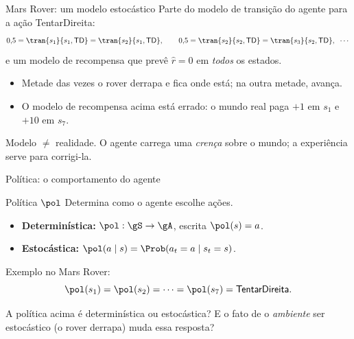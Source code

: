 \documentclass[aspectratio=169, 11pt]{beamer}
\newcommand{\paradiscussao}{\smallskip
  {\footnotesize\color{rlCinza}\itshape }}
\begin{document}
\begin{frame}{Mars Rover: um modelo estocástico}
  Parte do modelo de transição do agente para a ação
  \textsf{TentarDireita}:
  \[
    0{,}5 = \tran{s_1}{s_1, \textsf{TD}} = \tran{s_2}{s_1, \textsf{TD}},
    \qquad
    0{,}5 = \tran{s_2}{s_2, \textsf{TD}} = \tran{s_3}{s_2, \textsf{TD}},
    \;\;\cdots
  \]
  e um modelo de recompensa que prevê $\hat r = 0$ em \emph{todos} os
  estados.

  \begin{itemize}
    \item Metade das vezes o rover derrapa e fica onde está; na outra
          metade, avança.
    \item O modelo de recompensa acima está \alert{errado}: o mundo real
          paga $+1$ em $s_1$ e $+10$ em $s_7$.
  \end{itemize}

  \begin{ideiabox}
    Modelo $\neq$ realidade. O agente carrega uma \emph{crença} sobre o
    mundo; a experiência serve para corrigi-la.
  \end{ideiabox}
\end{frame}

\begin{frame}{Política: o comportamento do agente}
  \begin{defbox}{Política $\pol$}
    Determina como o agente escolhe ações.
    \begin{itemize}
      \item \textbf{Determinística:} $\pol : \gS \to \gA$, escrita
            $\pol(s) = a$.
      \item \textbf{Estocástica:} $\pol(a \mid s) =
            \Prob(a_t = a \mid s_t = s)$.
    \end{itemize}
  \end{defbox}

  \medskip
  Exemplo no Mars Rover:
  \[
    \pol(s_1) = \pol(s_2) = \cdots = \pol(s_7) = \textsf{TentarDireita}.
  \]

  \begin{quizbox}{}
    A política acima é determinística ou estocástica? E o fato de o
    \emph{ambiente} ser estocástico (o rover derrapa) muda essa resposta?
  \end{quizbox}
  \paradiscussao
\end{frame}
\end{document}
